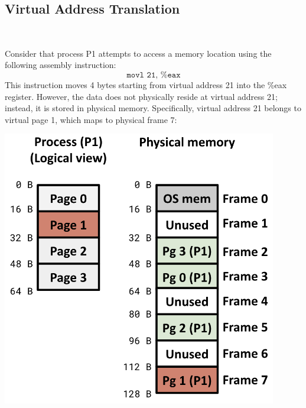 \documentclass[../../compsys.tex]{subfiles}
\begin{document}
\subsection{Virtual Address Translation}

\begin{example}
\leavevmode \\[2px]
\noindent
\begin{minipage}{0.45\textwidth}
Consider that process P1 attempts to access a memory location using the following assembly instruction:
\[
\texttt{movl 21, \%eax}
\]
This instruction moves 4 bytes starting from virtual address 21 into the \%eax register. However, the data does not physically reside at virtual address 21; instead, it is stored in physical memory. Specifically, virtual address 21 belongs to virtual page 1, which maps to physical frame 7:
\end{minipage}%
\hfill
\vline
\hfill
\begin{minipage}{0.45\textwidth}
\begin{center}
  \includegraphics[width=0.9\textwidth]{chapters/L5/images/paging-example3.png}
\end{center}
\end{minipage}\\
\end{example}
\newpage
\end{document}
